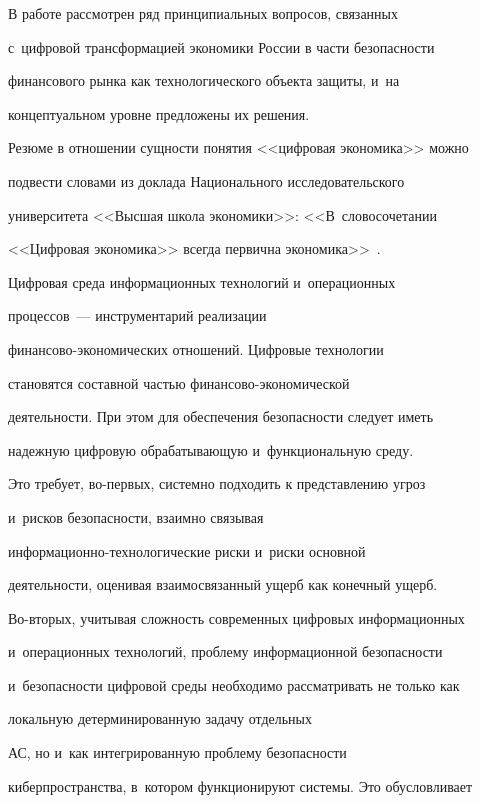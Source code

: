   В работе рассмотрен ряд принципиальных вопросов, связанных 

с~цифровой трансформацией экономики России в части безопасности 

финансового рынка как технологического объекта защиты, и~на 

концептуальном уровне предложены их решения.

  

  Резюме в отношении сущности понятия <<цифровая экономика>> можно 

под\-вес\-ти словами из доклада Национального исследовательского 

университета <<Высшая школа экономики>>: <<В~словосочетании 

<<Цифровая экономика>> всегда первична экономика>>~\cite{11-zk}.

  

  Цифровая среда информационных технологий и~операционных 

процессов~--- инструментарий реализации  

фи\-нан\-со\-во-эко\-но\-ми\-че\-ских отношений. Цифровые технологии 

становятся составной частью фи\-нан\-со\-во-эко\-но\-ми\-че\-ской 

дея\-тель\-ности. При этом для обеспечения без\-опас\-ности следует иметь 

надежную цифровую обрабатывающую и~функциональную среду. 

  

  Это требует, во-первых, системно подходить к представлению угроз 

и~рисков безопасности, взаимно связывая  

ин\-фор\-ма\-ци\-он\-но-тех\-но\-ло\-ги\-че\-ские риски и~риски основной 

деятельности, оценивая взаимосвязанный ущерб как конечный ущерб.

  

  Во-вторых, учитывая сложность современных цифровых информационных 

и~операционных технологий, проблему информационной без\-опас\-ности 

и~без\-опас\-ности цифровой среды необходимо рассматривать не только как 

локальную детерминированную задачу отдельных 

АС, но и~как интегрированную проблему безопасности 

киберпространства, в~котором функционируют системы. Это обусловливает 

